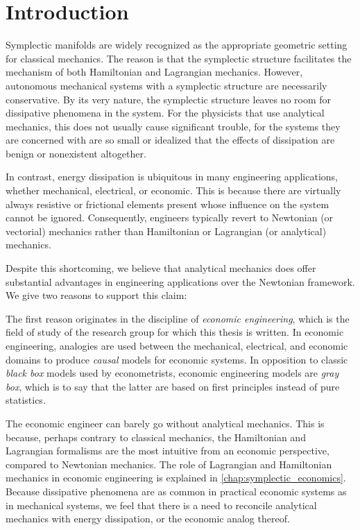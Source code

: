 \chapter{Introduction}
\label{chap:intro}

Symplectic manifolds are widely recognized as the appropriate geometric setting for classical mechanics. The reason is that the symplectic structure facilitates the mechanism of both Hamiltonian and Lagrangian mechanics. However, autonomous mechanical systems with a symplectic structure are necessarily conservative. By its very nature, the symplectic structure leaves no room for dissipative phenomena in the system. For the physicists that use analytical mechanics, this does not usually cause significant trouble, for the systems they are concerned with are so small or idealized that the effects of dissipation are benign or nonexistent altogether.

In contrast, energy dissipation is ubiquitous in many engineering applications, whether mechanical, electrical, or economic. This is because there are virtually always resistive or frictional elements present whose influence on the system cannot be ignored. Consequently, engineers typically revert to Newtonian (or vectorial) mechanics rather than Hamiltonian or Lagrangian (or analytical) mechanics.

Despite this shortcoming, we believe that analytical mechanics does offer substantial advantages in engineering applications over the Newtonian framework. We give two reasons to support this claim:

The first reason originates in the discipline of \emph{economic engineering}, which is the field of study of the research group for which this thesis is written. In economic engineering, analogies are used between the mechanical, electrical, and economic domains to produce \emph{causal} models for economic systems. In opposition to classic \emph{black box} models used by econometrists, economic engineering models are \emph{gray box}, which is to say that the latter are based on first principles instead of pure statistics. 

The economic engineer can barely go without analytical mechanics. This is because, perhaps contrary to classical mechanics, the Hamiltonian and Lagrangian formalisms are the most intuitive from an economic perspective, compared to Newtonian mechanics. The role of Lagrangian and Hamiltonian mechanics in economic engineering is explained in \cref{chap:symplectic_economics}. 
Because dissipative phenomena are as common in practical economic systems as in mechanical systems, we feel that there is a need to reconcile analytical mechanics with energy dissipation, or the economic analog thereof.

